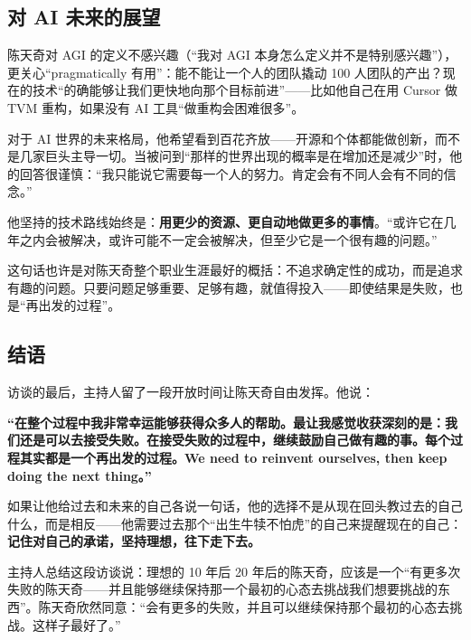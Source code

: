 \subsection{对 AI 未来的展望}

陈天奇对 AGI 的定义不感兴趣（``我对 AGI 本身怎么定义并不是特别感兴趣''），更关心``pragmatically 有用''：能不能让一个人的团队撬动 100 人团队的产出？现在的技术``的确能够让我们更快地向那个目标前进''------比如他自己在用 Cursor 做 TVM 重构，如果没有 AI 工具``做重构会困难很多''。

对于 AI 世界的未来格局，他希望看到百花齐放------开源和个体都能做创新，而不是几家巨头主导一切。当被问到``那样的世界出现的概率是在增加还是减少''时，他的回答很谨慎：``我只能说它需要每一个人的努力。肯定会有不同人会有不同的信念。''

他坚持的技术路线始终是：\textbf{用更少的资源、更自动地做更多的事情}。``或许它在几年之内会被解决，或许可能不一定会被解决，但至少它是一个很有趣的问题。''

这句话也许是对陈天奇整个职业生涯最好的概括：不追求确定性的成功，而是追求有趣的问题。只要问题足够重要、足够有趣，就值得投入------即使结果是失败，也是``再出发的过程''。

\subsection{结语}

访谈的最后，主持人留了一段开放时间让陈天奇自由发挥。他说：

\textbf{``在整个过程中我非常幸运能够获得众多人的帮助。最让我感觉收获深刻的是：我们还是可以去接受失败。在接受失败的过程中，继续鼓励自己做有趣的事。每个过程其实都是一个再出发的过程。We need to reinvent ourselves, then keep doing the next thing。''}

如果让他给过去和未来的自己各说一句话，他的选择不是从现在回头教过去的自己什么，而是相反------他需要过去那个``出生牛犊不怕虎''的自己来提醒现在的自己：\textbf{记住对自己的承诺，坚持理想，往下走下去。}

主持人总结这段访谈说：理想的 10 年后 20 年后的陈天奇，应该是一个``有更多次失败的陈天奇------并且能够继续保持那一个最初的心态去挑战我们想要挑战的东西''。陈天奇欣然同意：``会有更多的失败，并且可以继续保持那个最初的心态去挑战。这样子最好了。''

